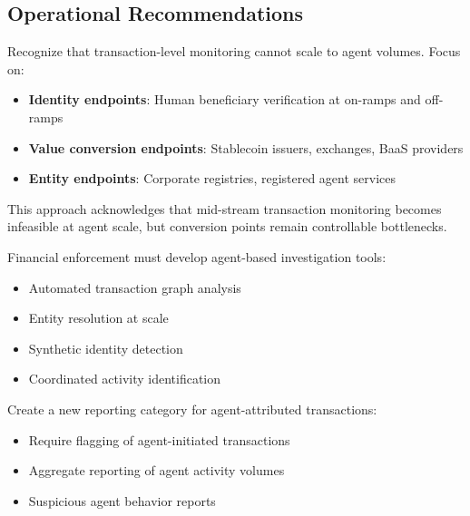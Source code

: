 \documentclass[11pt,letterpaper]{article}
\begin{document}
\subsection{Operational Recommendations}

\begin{recbox}
Recognize that transaction-level monitoring cannot scale to agent volumes. Focus on:
\begin{itemize}
  \item \textbf{Identity endpoints}: Human beneficiary verification at on-ramps and off-ramps
  \item \textbf{Value conversion endpoints}: Stablecoin issuers, exchanges, BaaS providers
  \item \textbf{Entity endpoints}: Corporate registries, registered agent services
\end{itemize}

This approach acknowledges that mid-stream transaction monitoring becomes infeasible at agent scale, but conversion points remain controllable bottlenecks.
\end{recbox}

\begin{recbox}
Financial enforcement must develop agent-based investigation tools:
\begin{itemize}
  \item Automated transaction graph analysis
  \item Entity resolution at scale
  \item Synthetic identity detection
  \item Coordinated activity identification
\end{itemize}
\end{recbox}

\begin{recbox}
Create a new reporting category for agent-attributed transactions:
\begin{itemize}
  \item Require flagging of agent-initiated transactions
  \item Aggregate reporting of agent activity volumes
  \item Suspicious agent behavior reports
\end{itemize}
\end{recbox}
\end{document}
